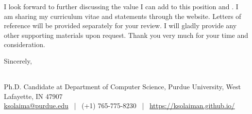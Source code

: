 \documentclass[11pt]{article}
\renewcommand*\paragraph[1]{}
\begin{document}
\paragraph{P3) Relevant industrial experience beneficial to CS/ DS curriculum development and CS/DS capstone project advising}




I look forward to further discussing the value I can add to this position and \InstitutionName{}. I am sharing my curriculum vitae and statements through the website.
Letters of reference will be provided separately for your review. I will gladly provide any other supporting materials upon request. Thank you very much for your time and consideration.

\bigskip
Sincerely, 

\Name{} \\
\normalsize  \textnormal{
          Ph.D. Candidate at Department of Computer Science, Purdue University, West Lafayette, IN 47907
        }\\
        \normalsize \textnormal{ %
          \href{mailto:ksolaima@purdue.edu}{ksolaima@purdue.edu} ~|~ %
          (+1) 765-775-8230 ~|~ %
          \href{https://ksolaiman.github.io/}{https://ksolaiman.github.io/}
}

\end{document}
